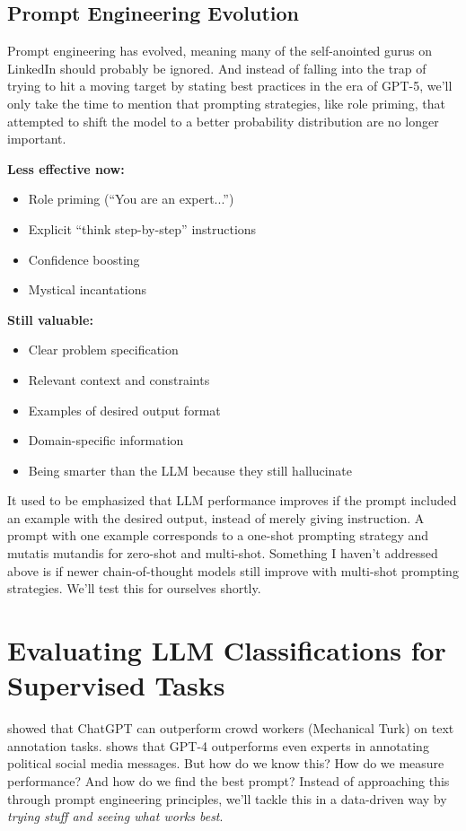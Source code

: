 \subsection{Prompt Engineering Evolution}

Prompt engineering has evolved, meaning many of the self-anointed gurus on LinkedIn should probably be ignored. And instead of falling into the trap of trying to hit a moving target by stating best practices in the era of GPT-5, we'll only take the time to mention that prompting strategies, like role priming, that attempted to shift the model to a better probability distribution are no longer important.

\textbf{Less effective now:}
\begin{itemize}
\item Role priming (``You are an expert...'')
\item Explicit ``think step-by-step'' instructions
\item Confidence boosting
\item Mystical incantations
\end{itemize}

\textbf{Still valuable:}
\begin{itemize}
\item Clear problem specification
\item Relevant context and constraints
\item Examples of desired output format
\item Domain-specific information
\item Being smarter than the LLM because they still hallucinate
\end{itemize}

It used to be emphasized that LLM performance improves if the prompt included an example with the desired output, instead of merely giving instruction. A prompt with one example corresponds to a one-shot prompting strategy and mutatis mutandis for zero-shot and multi-shot. Something I haven't addressed above is if newer chain-of-thought models still improve with multi-shot prompting strategies. We'll test this for ourselves shortly.

\section{Evaluating LLM Classifications for Supervised Tasks}

\cite{gilardi2023chatgpt} showed that ChatGPT can outperform crowd workers (Mechanical Turk) on text annotation tasks. \cite{tornberg2024large} shows that GPT-4 outperforms even experts in annotating political social media messages. But how do we know this? How do we measure performance? And how do we find the best prompt? Instead of approaching this through prompt engineering principles, we'll tackle this in a data-driven way by \textit{trying stuff and seeing what works best}.

